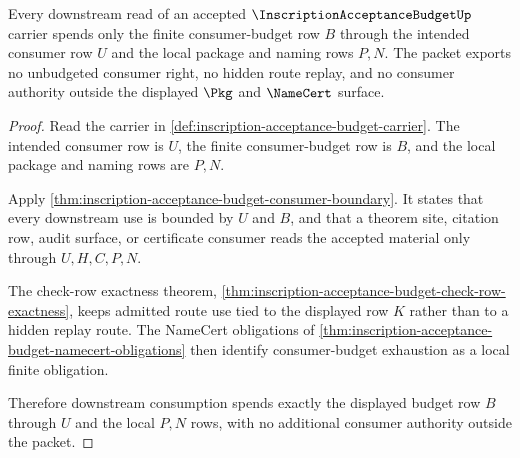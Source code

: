 \begin{theorem}
\label{thm:inscription-acceptance-budget-budget-spend-exactness}
Every downstream read of an accepted $\InscriptionAcceptanceBudgetUp$ carrier spends only the finite consumer-budget row $B$ through the intended consumer row $U$ and the local package and naming rows $P,N$. The packet exports no unbudgeted consumer right, no hidden route replay, and no consumer authority outside the displayed $\Pkg$ and $\NameCert$ surface.
\end{theorem}
\begin{proof}
Read the carrier in \autoref{def:inscription-acceptance-budget-carrier}. The intended consumer row is $U$, the finite consumer-budget row is $B$, and the local package and naming rows are $P,N$.

Apply \autoref{thm:inscription-acceptance-budget-consumer-boundary}. It states that every downstream use is bounded by $U$ and $B$, and that a theorem site, citation row, audit surface, or certificate consumer reads the accepted material only through $U,H,C,P,N$.

The check-row exactness theorem, \autoref{thm:inscription-acceptance-budget-check-row-exactness}, keeps admitted route use tied to the displayed row $K$ rather than to a hidden replay route. The NameCert obligations of \autoref{thm:inscription-acceptance-budget-namecert-obligations} then identify consumer-budget exhaustion as a local finite obligation.

Therefore downstream consumption spends exactly the displayed budget row $B$ through $U$ and the local $P,N$ rows, with no additional consumer authority outside the packet.
\end{proof}

